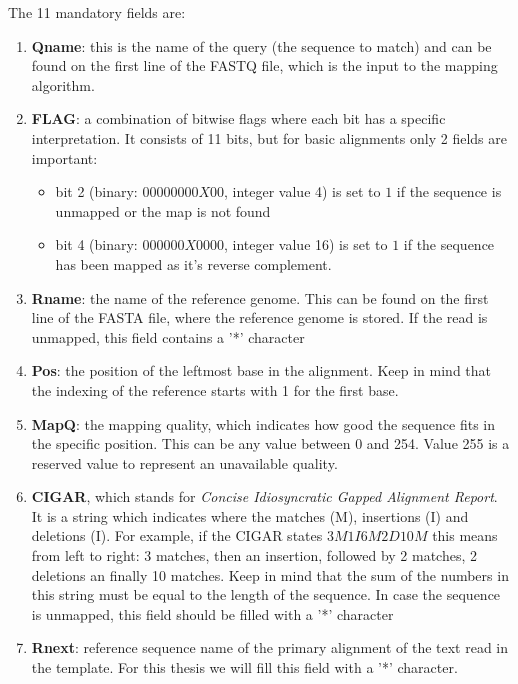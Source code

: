 The 11 mandatory fields are:
\begin{enumerate}
	
	\item \textbf{Qname}: this is the name of the query (the sequence to match) and can be found on the first line of the FASTQ file, which is the input to the mapping algorithm.
	
	\item \textbf{FLAG}: a combination of bitwise flags where each bit has a specific interpretation. It consists of 11 bits, but for basic alignments only 2 fields are important:
	\begin{itemize}
		\item bit 2 (binary: $00000000X00$, integer value 4) is set to $1$ if the sequence is unmapped or the map is not found
		\item bit 4 (binary: $000000X0000$, integer value 16) is set to $1$ if the sequence has been mapped as it's reverse complement.
	\end{itemize}

	\item \textbf{Rname}: the name of the reference genome. This can be found on the first line of the FASTA file, where the reference genome is stored. If the read is unmapped, this field contains a '*' character
	
	\item \textbf{Pos}: the position of the leftmost base in the alignment. Keep in mind that the indexing of the reference starts with 1 for the first base.
	
	\item \textbf{MapQ}: the mapping quality, which indicates how good the sequence fits in the specific position. This can be any value between 0 and 254. Value 255 is a reserved value to represent an unavailable quality.
	
	\item \textbf{CIGAR}, which stands for \textit{Concise Idiosyncratic Gapped Alignment Report}. It is a string which indicates where the matches (M), insertions (I) and deletions (I). For example, if the CIGAR states $3M1I6M2D10M$ this means from left to right: 3 matches, then an insertion, followed by 2 matches, 2 deletions an finally 10 matches. Keep in mind that the sum of the numbers in this string must be equal to the length of the sequence. In case the sequence is unmapped, this field should be filled with a '*' character
	
	\item \textbf{Rnext}: reference sequence name of the primary alignment of the text read in the template. For this thesis we will fill this field with a '*' character. 
	

\end{enumerate}
